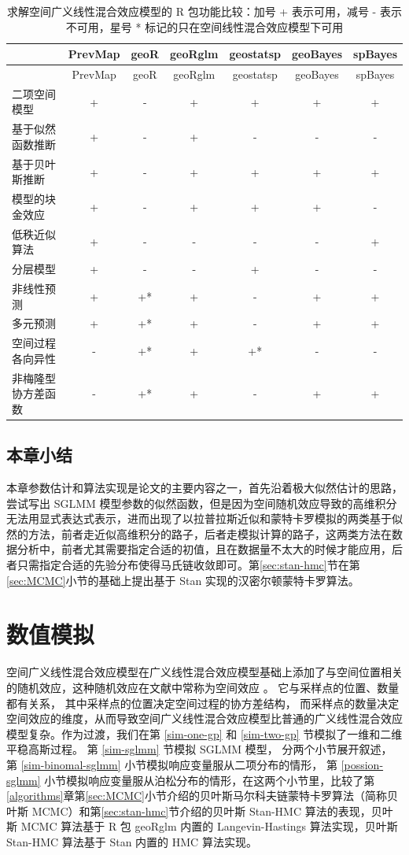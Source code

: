 \documentclass[12pt,a4paper,UTF8,twoside]{book}
\theoremstyle{definition}
\theoremstyle{definition}
\theoremstyle{definition}
\theoremstyle{remark}
\begin{document}
\begin{longtable}[]{@{}lcccccc@{}}
\caption{\label{tab:sglmm-packages} 求解空间广义线性混合效应模型的 R 包功能比较：加号 + 表示可用，减号 - 表示不可用，星号 * 标记的只在空间线性混合效应模型下可用}\tabularnewline
\toprule
& PrevMap & geoR & geoRglm & geostatsp & geoBayes & spBayes\tabularnewline
\midrule
\endfirsthead
\toprule
& PrevMap & geoR & geoRglm & geostatsp & geoBayes & spBayes\tabularnewline
\midrule
\endhead
二项空间模型 & + & - & + & + & + & +\tabularnewline
基于似然函数推断 & + & - & + & - & - & -\tabularnewline
基于贝叶斯推断 & + & - & + & + & + & +\tabularnewline
模型的块金效应 & + & - & + & + & + & -\tabularnewline
低秩近似算法 & + & - & - & - & - & +\tabularnewline
分层模型 & + & - & - & + & - & -\tabularnewline
非线性预测 & + & +* & + & - & + & +\tabularnewline
多元预测 & + & +* & + & - & + & +\tabularnewline
空间过程各向异性 & - & +* & + & +* & - & -\tabularnewline
非梅隆型协方差函数 & - & +* & + & - & + & +\tabularnewline
\bottomrule
\end{longtable}

\hypertarget{sec:estimations}{%
\section{本章小结}\label{sec:estimations}}

本章参数估计和算法实现是论文的主要内容之一，首先沿着极大似然估计的思路，尝试写出 SGLMM 模型参数的似然函数，但是因为空间随机效应导致的高维积分无法用显式表达式表示，进而出现了以拉普拉斯近似和蒙特卡罗模拟的两类基于似然的方法，前者走近似高维积分的路子，后者走模拟计算的路子，这两类方法在数据分析中，前者尤其需要指定合适的初值，且在数据量不太大的时候才能应用，后者只需指定合适的先验分布使得马氏链收敛即可。第\ref{sec:stan-hmc}节在第\ref{sec:MCMC}小节的基础上提出基于 Stan 实现的汉密尔顿蒙特卡罗算法。

\hypertarget{simulations}{%
\chapter{数值模拟}\label{simulations}}

空间广义线性混合效应模型在广义线性混合效应模型基础上添加了与空间位置相关的随机效应，这种随机效应在文献中常称为空间效应 \citep{Diggle1998}。 它与采样点的位置、数量都有关系， 其中采样点的位置决定空间过程的协方差结构， 而采样点的数量决定空间效应的维度，从而导致空间广义线性混合效应模型比普通的广义线性混合效应模型复杂。作为过渡，我们在第 \ref{sim-one-gp} 和 \ref{sim-two-gp} 节模拟了一维和二维平稳高斯过程。 第 \ref{sim-sglmm} 节模拟 SGLMM 模型， 分两个小节展开叙述，第 \ref{sim-binomal-sglmm} 小节模拟响应变量服从二项分布的情形， 第 \ref{possion-sglmm} 小节模拟响应变量服从泊松分布的情形，在这两个小节里，比较了第\ref{algorithms}章第\ref{sec:MCMC}小节介绍的贝叶斯马尔科夫链蒙特卡罗算法（简称贝叶斯 MCMC）和第\ref{sec:stan-hmc}节介绍的贝叶斯 Stan-HMC 算法的表现，贝叶斯 MCMC 算法基于 R 包 geoRglm 内置的 Langevin-Hastings 算法实现，贝叶斯 Stan-HMC 算法基于 Stan 内置的 HMC 算法实现。
\end{document}
